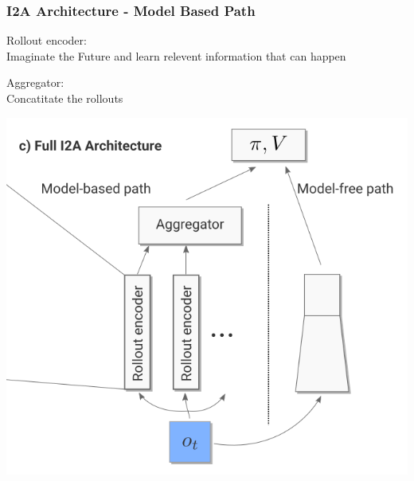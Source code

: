 \begin{frame}
    \frametitle{I2A Architecture - Model Based Path}

\begin{multicols}{2}
	\begin{PraesentationAufzaehlung}
	    \item Rollout encoder:\\
		Imaginate the Future and learn relevent information that can happen
		\item Aggregator: \\
		Concatitate the rollouts
	\end{PraesentationAufzaehlung}
    \vfill\columnbreak
    \includegraphics[width=\columnwidth, height=.7\textheight]{./Images/full_i2a_architecture.png}%
\end{multicols}
    
\end{frame}
\clearpage


